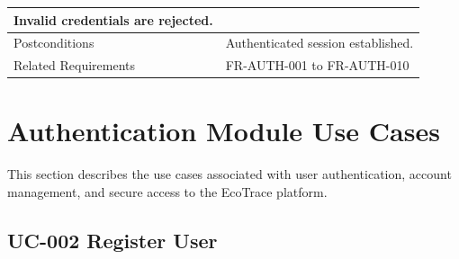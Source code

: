 \begin{longtable}{|p{4cm}|p{10cm}|}
Invalid credentials are rejected.

\\

\hline

Postconditions

&

Authenticated session established.

\\

\hline

Related Requirements

&

FR-AUTH-001 to FR-AUTH-010

\\

\hline

\end{longtable}

\section{Authentication Module Use Cases}
\label{sec:authentication-usecases}

This section describes the use cases associated with user
authentication, account management, and secure access to the EcoTrace
platform.

\subsection{UC-002 Register User}

